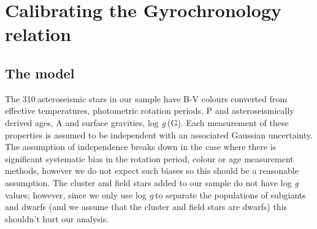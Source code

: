 \documentclass[10pt,preprint]{aastex}
\newcommand{\logg}{log \emph{g}}
\newcommand{\teff}{$T_{eff}$}
\newcommand{\nastero}{310}
\newcommand{\ntotal}{597~}
\begin{document}



\section{Calibrating the Gyrochronology relation}
\label{sec:gyro_cal}

\subsection{The model}

The \nastero$~$asteroseismic stars in our sample have B-V colours converted from effective temperatures, photometric rotation periods, P and asteroseismically derived ages, A and surface gravities, \logg$~$(G).
Each measurement of these properties is assumed to be independent with an associated Gaussian uncertainty.
The assumption of independence breaks down in the case where there is significant systematic bias in the rotation period, colour or age measurement methods, however we do not expect such biases so this should be a reasonable assumption.
The cluster and field stars added to our sample do not have \logg$~$values; however, since we only use \logg$~$to separate the populations of subgiants and dwarfs (and we assume that the cluster and field stars are dwarfs) this shouldn't hurt our analysis.
\end{document}

